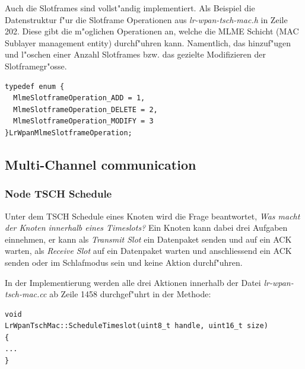 Auch die Slotframes sind vollst"andig implementiert. Als Beispiel die
Datenstruktur f"ur die Slotframe Operationen aus \textit{lr-wpan-tsch-mac.h}
in Zeile 202. Diese gibt die m"oglichen Operationen an, welche die MLME Schicht
(MAC Sublayer management entity) durchf"uhren kann. Namentlich, das hinzuf"ugen
und l"oschen einer Anzahl Slotframes bzw. das gezielte Modifizieren der
Slotframegr"osse.

\begin{lstlisting}[frame=single]
typedef enum {
  MlmeSlotframeOperation_ADD = 1,
  MlmeSlotframeOperation_DELETE = 2,
  MlmeSlotframeOperation_MODIFY = 3
}LrWpanMlmeSlotframeOperation;
\end{lstlisting}

\subsection{Multi-Channel communication}

\subsubsection{Node TSCH Schedule}

Unter dem TSCH Schedule eines Knoten wird die Frage beantwortet,
\textit{Was macht der Knoten innerhalb eines Timeslots?}
Ein Knoten kann dabei drei Aufgaben einnehmen, er kann als \textit{Transmit Slot}
ein Datenpaket senden und auf ein ACK warten, als \textit{Receive Slot} auf ein
Datenpaket warten und anschliessend ein ACK senden oder im Schlafmodus sein
und keine Aktion durchf"uhren.

In der Implementierung werden alle drei Aktionen innerhalb der Datei
\textit{lr-wpan-tsch-mac.cc} ab Zeile 1458 durchgef"uhrt in der Methode:

\begin{lstlisting}[frame=single]
void
LrWpanTschMac::ScheduleTimeslot(uint8_t handle, uint16_t size)
{
...
}
\end{lstlisting}

